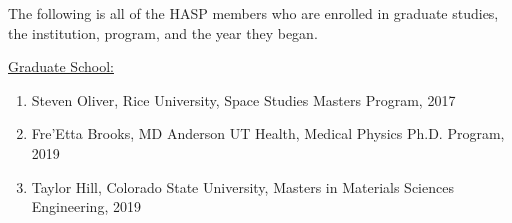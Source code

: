 \begin{appendices}
  \vspace{0.5cm}
  
  \noindent The following is all of the HASP members who are enrolled in graduate studies, the institution, program, and the year they began.
  
  \vspace{0.25cm}
  \noindent\underline{Graduate School:}
  \begin{enumerate}[leftmargin=3\parindent]
  \item Steven Oliver, Rice University, Space Studies Masters Program, 2017
  \item Fre'Etta Brooks, MD Anderson UT Health, Medical Physics Ph.D. Program, 2019
  \item Taylor Hill, Colorado State University, Masters in Materials Sciences Engineering, 2019
  \end{enumerate}

  
\end{appendices}
